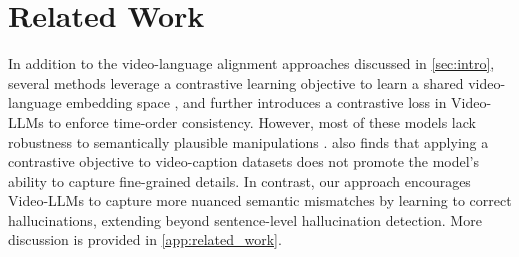 \section{Related Work}
In addition to the video-language alignment approaches discussed in \autoref{sec:intro}, several methods leverage a contrastive learning objective to learn a shared video-language embedding space \cite{xue2023clipvip, rasheed2023fine, girdhar2023imagebind, zhu2024languagebind}, and \citet{bagad2023test} further introduces a contrastive loss in Video-LLMs to enforce time-order consistency. 
However, most of these models lack robustness to semantically plausible manipulations \cite{park2022exposing}. 
\citet{yuksekgonul2022and} also finds that applying a contrastive objective to video-caption datasets does not promote the model’s ability to capture fine-grained details. 
In contrast, our approach encourages Video-LLMs to capture more nuanced semantic mismatches by learning to correct hallucinations, extending beyond sentence-level hallucination detection.
More discussion is provided in \autoref{app:related_work}.

